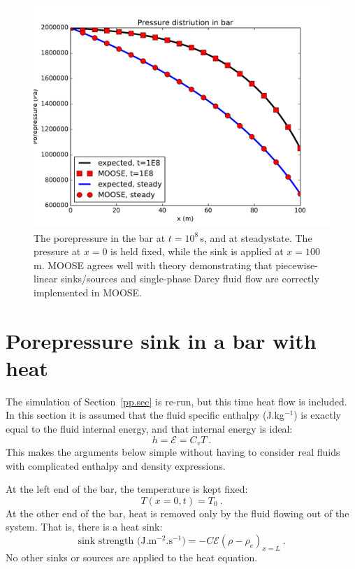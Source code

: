 \begin{figure}[htb]
\begin{center}
\includegraphics[width=17cm]{nc.pdf}
\caption{The porepressure in the bar at $t=10^{8}$\,s, and at
  steadystate.  The pressure at $x=0$ is held fixed, while the sink is
  applied at $x=100$\,m.  MOOSE agrees well with theory demonstrating
  that piecewise-linear sinks/sources and single-phase Darcy fluid
  flow are correctly implemented in MOOSE.}
\label{nc.fig}
\end{center}
\end{figure}


\section{Porepressure sink in a bar with heat}
\label{pp.heat.sec}

The simulation of Section~\ref{pp.sec} is re-run, but this time
heat flow is included.  In this section it is assumed that the fluid
specific enthalpy (J.kg$^{-1}$) is exactly equal to the fluid internal
energy, and that internal energy is ideal:
\begin{equation}
h = {\mathcal E} = C_{v}T \ .
\end{equation}
This makes the arguments below simple without having to consider real
fluids with complicated enthalpy and density expressions.

At the left end of the bar, the temperature is kept fixed:
\begin{equation}
T(x=0, t) = T_{0} \ .
\end{equation}
At the other end of the bar, heat is removed only by the fluid flowing
out of the system.  That is, there is a heat sink:
\begin{equation}
\mbox{sink strength (J.m$^{-2}$.s$^{-1}$)} = -C {\mathcal E}\left(\rho -
\rho_{e}\right)_{x=L} \ .
\end{equation}
No other sinks or sources are applied to the heat equation.

